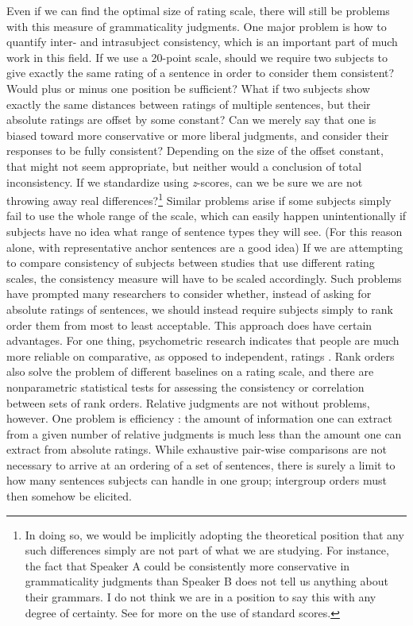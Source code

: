 Even if we can find the optimal size of rating scale, there will still be problems with this measure of grammaticality judgments. One major problem is how to quantify inter- and intrasubject consistency, which is an important part of much work in this field. If we use a 20-point scale, should we require two subjects to give exactly the same rating of a sentence in order to consider them consistent? Would plus or minus one position be sufficient? What if two subjects show exactly the same distances between ratings of multiple sentences, but their absolute ratings are offset by some constant? Can we merely say that one is biased toward more conservative or more liberal judgments, and consider their responses to be fully consistent? Depending on the size of the offset constant, that might not seem appropriate, but neither would a conclusion of total inconsistency. If we standardize using \textit{z}-scores, can we be sure we are not throwing away real differences?\footnote{In doing so, we would be implicitly adopting the theoretical position that any such differences simply are not part of what we are studying. For instance, the fact that Speaker A could be consistently more conservative in grammaticality judgments than Speaker B does not tell us anything about their grammars. I do not think we are in a position to say this with any degree of certainty. See \citet[13\textendash{}14, 114]{Cowart1997} for more on the use of standard scores.}
 Similar problems arise if some subjects simply fail to use the whole range of the scale, which can easily happen unintentionally if subjects have no idea what range of sentence types they will see. (For this reason alone,  with representative anchor sentences are a good idea) If we are attempting to compare consistency  of subjects between  studies that use different rating
scales, the consistency measure will have to be scaled accordingly. Such problems have prompted many researchers to consider whether, instead of asking for absolute ratings of sentences, we should instead require subjects simply to rank order them from most to least acceptable. This approach does have certain advantages. For one thing, psychometric research indicates that people are much more reliable on comparative, as opposed to independent, ratings \citep{Mohan1977}. Rank orders also solve the problem of different baselines on a rating scale, and there are nonparametric statistical tests for assessing the consistency or correlation between sets of rank orders. Relative judgments are not without problems, however. One problem is efficiency \citep{MaclayEtAl1960}: the amount of information one can extract from a given number of relative judgments is much less than the amount one can extract from absolute ratings. While exhaustive pair-wise comparisons are not necessary to arrive at an ordering of a set of sentences, there is surely a limit to how many sentences subjects can handle in one group; intergroup orders must then somehow be elicited.

